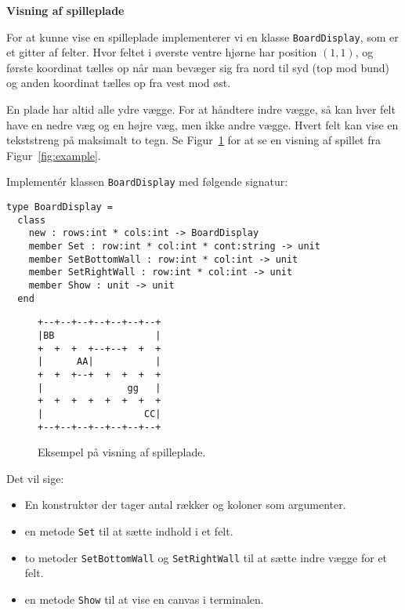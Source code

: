 \textbf{Visning af spilleplade}

For at kunne vise en spilleplade implementerer vi en klasse
\lstinline{BoardDisplay}, som er et gitter af felter. Hvor feltet
i øverste ventre hjørne har position $(1,1)$, og første koordinat
tælles op når man bevæger sig
fra nord til syd (top mod bund) og anden koordinat tælles op fra vest mod øst.

En plade har altid alle ydre vægge. For at håndtere indre vægge, så
kan hver felt have en nedre væg og en højre væg, men ikke andre vægge.
Hvert felt kan vise en tekststreng på maksimalt to tegn. Se
Figur~\ref{fig:example-text} for at se en visning af spillet fra
Figur~\ref{fig:example}.

Implementér klassen \lstinline{BoardDisplay} med følgende signatur:

\begin{lstlisting}
type BoardDisplay =
  class
    new : rows:int * cols:int -> BoardDisplay
    member Set : row:int * col:int * cont:string -> unit
    member SetBottomWall : row:int * col:int -> unit
    member SetRightWall : row:int * col:int -> unit
    member Show : unit -> unit
  end
\end{lstlisting}

\begin{figure}%
  \begin{center}
    \begin{minipage}{5cm}
\begin{verbatim}
+--+--+--+--+--+--+--+
|BB                  |
+  +  +  +--+--+  +  +
|      AA|           |
+  +  +--+  +  +  +  +
|               gg   |
+  +  +  +  +  +  +  +
|                  CC|
+--+--+--+--+--+--+--+
\end{verbatim}
    \end{minipage}
  \end{center}
  \caption{Eksempel på visning af spilleplade.}
  \label{fig:example-text}
\end{figure}

Det vil sige:
\begin{itemize}
\item En konstruktør der tager antal rækker og koloner som argumenter.
\item en metode \lstinline{Set} til at sætte indhold i et
  felt.
\item to metoder \lstinline{SetBottomWall} og \lstinline{SetRightWall}
  til at sætte indre vægge for et
  felt.
\item en metode \lstinline{Show} til at vise en canvas i
  terminalen.
\end{itemize}

